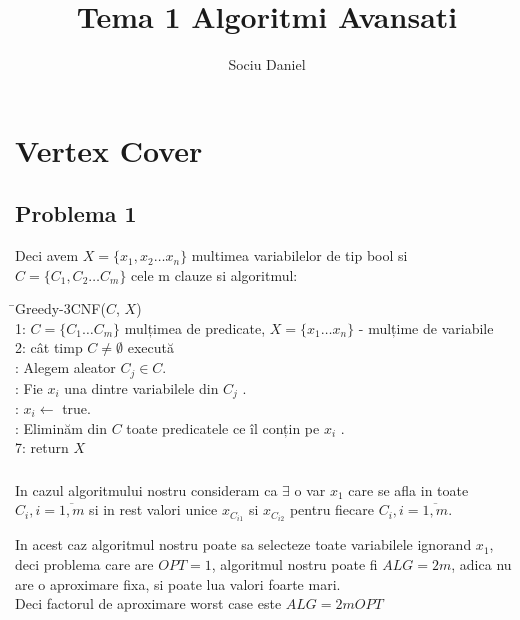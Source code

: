 \documentclass[a4paper]{report}
\title{Tema 1 Algoritmi Avansati}
\author{Sociu Daniel}
\begin{document}
\chapter*{Vertex Cover}
\setcounter{section}{0}

\section{Problema 1}

Deci avem $X=\{x_{1},x_{2}\dots x_{n}\}$ multimea variabilelor de tip bool si $C=\{C_{1},C_{2}\dots C_{m}\}$ cele m clauze si algoritmul:

\begin{tabbing}
\hspace{2em}
\= \kill Greedy-3CNF($C$, $X$)\\
1: $C=\{C_{1}\dots C_{m}\}$ mulțimea de predicate, $X=\{x_{1}\dots x_{n}\}$ - mulțime de variabile\\ 
2: cât timp $C\neq \emptyset$ execută\\ 
: Alegem aleator $C_{j}\in C$.\\
: Fie $x_{i}$ una dintre variabilele din $C_{j}$ .\\
: $x_{i}\leftarrow$ true.\\
: Eliminăm din $C$ toate predicatele ce îl conțin pe $x_{i}$ .\\
7: return $X$\\
\end{tabbing}


\subsection{}

In cazul algoritmului nostru consideram ca $\exists$ o var $x_{1}$ care se afla in toate $C_{i}, i=\overline{1,m}$ si in rest valori unice $x_{C_{i1}}$ si $x_{C_{i2}}$ pentru fiecare $C_{i}, i=\overline{1,m}$.

In acest caz algoritmul nostru poate sa selecteze toate variabilele ignorand $x_{1}$, deci problema care are $OPT=1$, algoritmul nostru poate fi $ALG=2m$, adica nu are o aproximare fixa, si poate lua valori foarte mari.\\

Deci factorul de aproximare worst case este $ALG=2mOPT$

\subsection{}
\end{document}
